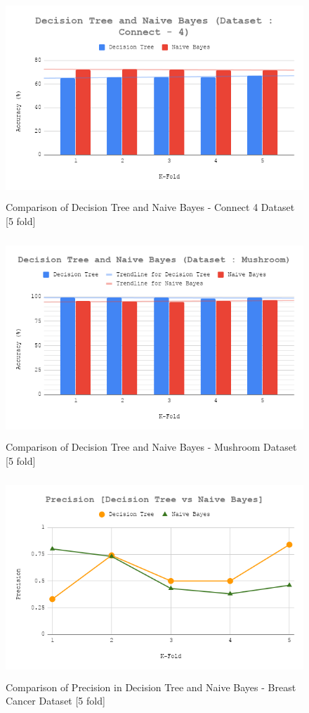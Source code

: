 \documentclass[12pt]{article}
\begin{document}
\begin{figure}[H]
	\centering
	\includegraphics[width = .8\columnwidth, height = 7.5cm]{Connect4.png}
	\caption{Comparison of Decision Tree and Naive Bayes - Connect 4 Dataset [5 fold]}
	\label{fig:connect4}
\end{figure}

\begin{figure}[H]
	\centering
	\includegraphics[width = .8\columnwidth, height = 7.5cm]{Mushroom.png}
	\caption{Comparison of Decision Tree and Naive Bayes - Mushroom Dataset [5 fold]}
	\label{fig:mushroom}
\end{figure}

\begin{figure}[H]
	\centering
	\includegraphics[width = .8\columnwidth, height = 7.5cm]{Precision.png}
	\caption{Comparison of Precision in Decision Tree and Naive Bayes - Breast Cancer Dataset [5 fold]}
	\label{fig:prec}
\end{figure}
\end{document}
